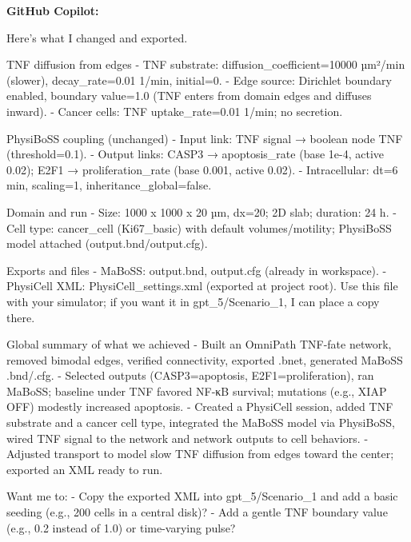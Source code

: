 \documentclass[11pt,a4paper]{article}
\begin{document}
\begin{copilotbox}
\textbf{GitHub Copilot:}

Here’s what I changed and exported.

TNF diffusion from edges
- TNF substrate: diffusion\_coefficient=10000 µm²/min (slower), decay\_rate=0.01 1/min, initial=0.
- Edge source: Dirichlet boundary enabled, boundary value=1.0 (TNF enters from domain edges and diffuses inward).
- Cancer cells: TNF uptake\_rate=0.01 1/min; no secretion.

PhysiBoSS coupling (unchanged)
- Input link: TNF signal → boolean node TNF (threshold=0.1).
- Output links: CASP3 → apoptosis\_rate (base 1e-4, active 0.02); E2F1 → proliferation\_rate (base 0.001, active 0.02).
- Intracellular: dt=6 min, scaling=1, inheritance\_global=false.

Domain and run
- Size: 1000 x 1000 x 20 µm, dx=20; 2D slab; duration: 24 h.
- Cell type: cancer\_cell (Ki67\_basic) with default volumes/motility; PhysiBoSS model attached (output.bnd/output.cfg).

Exports and files
- MaBoSS: output.bnd, output.cfg (already in workspace).
- PhysiCell XML: PhysiCell\_settings.xml (exported at project root). Use this file with your simulator; if you want it in gpt\_5/Scenario\_1, I can place a copy there.

Global summary of what we achieved
- Built an OmniPath TNF-fate network, removed bimodal edges, verified connectivity, exported .bnet, generated MaBoSS .bnd/.cfg.
- Selected outputs (CASP3=apoptosis, E2F1=proliferation), ran MaBoSS; baseline under TNF favored NF-κB survival; mutations (e.g., XIAP OFF) modestly increased apoptosis.
- Created a PhysiCell session, added TNF substrate and a cancer cell type, integrated the MaBoSS model via PhysiBoSS, wired TNF signal to the network and network outputs to cell behaviors.
- Adjusted transport to model slow TNF diffusion from edges toward the center; exported an XML ready to run.

Want me to:
- Copy the exported XML into gpt\_5/Scenario\_1 and add a basic seeding (e.g., 200 cells in a central disk)?
- Add a gentle TNF boundary value (e.g., 0.2 instead of 1.0) or time-varying pulse?

\end{copilotbox}
\end{document}
